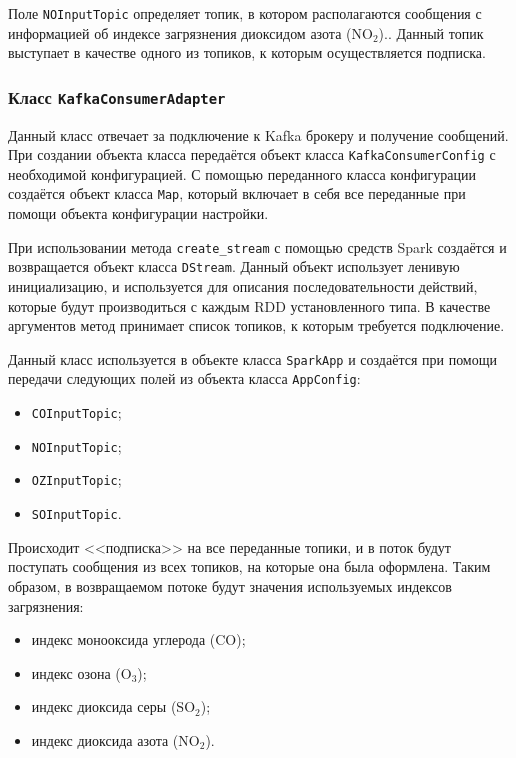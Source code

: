 Поле \texttt{NOInputTopic} определяет топик, в котором располагаются сообщения с информацией об индексе загрязнения диоксидом азота ($ \text{NO}_{\text{2}} $)..
Данный топик выступает в качестве одного из топиков, к которым осуществляется подписка.

\subsubsection{Класс \texttt{KafkaConsumerAdapter}}
Данный класс отвечает за подключение к Kafka брокеру и получение сообщений.
При создании объекта класса передаётся объект класса \texttt{KafkaConsumerConfig} с необходимой конфигурацией.
С помощью переданного класса конфигурации создаётся объект класса \texttt{Map}, который включает в себя все переданные при помощи объекта конфигурации настройки.

При использовании метода \texttt{create\_stream} с помощью средств Spark создаётся и возвращается объект класса \texttt{DStream}.
Данный объект использует ленивую инициализацию, и используется для описания последовательности действий, которые будут производиться с каждым RDD установленного типа.
В качестве аргументов метод принимает список топиков, к которым требуется подключение.

Данный класс используется в объекте класса \texttt{SparkApp} и создаётся при помощи передачи следующих полей из объекта класса \texttt{AppConfig}:
\begin{itemize}
    \item \texttt{COInputTopic};
    \item \texttt{NOInputTopic};
    \item \texttt{OZInputTopic};
    \item \texttt{SOInputTopic}.
\end{itemize}

Происходит <<подписка>> на все переданные топики, и в поток будут поступать сообщения из всех топиков, на которые она была оформлена.
Таким образом, в возвращаемом потоке будут значения используемых индексов загрязнения:
\begin{itemize}
    \item индекс монооксида углерода ($ \text{CO} $);
    \item индекс озона ($ \text{O}_{\text{3}} $);
    \item индекс диоксида серы ($ \text{SO}_{\text{2}} $);
    \item индекс диоксида азота ($ \text{NO}_{\text{2}} $).
\end{itemize}

